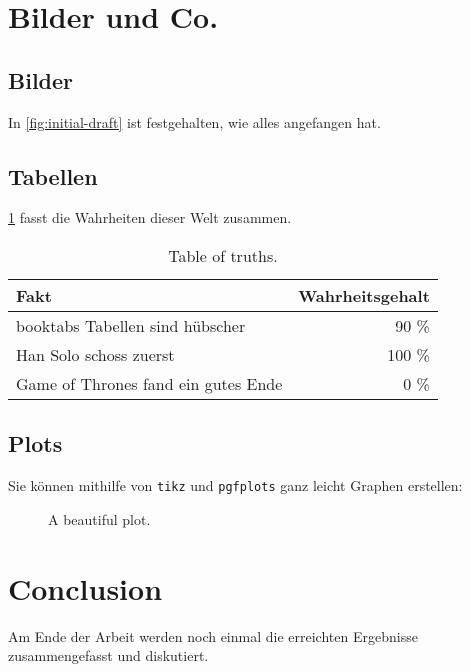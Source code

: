 \section{Bilder und Co.}

\subsection{Bilder}%
\label{sec:figures}

In \cref{fig:initial-draft} ist festgehalten,
wie alles angefangen hat.


\subsection{Tabellen}%
\label{sec:tables}

\cref{table:truths} fasst die Wahrheiten dieser Welt zusammen.

\begin{table}[ht]
  \begin{center}
    \begin{tabular}{lr}
      \toprule
      Fakt                                & Wahrheitsgehalt \\
      \midrule
      booktabs Tabellen sind hübscher     & 90 \%           \\
      Han Solo schoss zuerst              & 100 \%          \\
      Game of Thrones fand ein gutes Ende & 0 \%            \\
      \bottomrule
    \end{tabular}
    \caption{Table of truths.}%
    \label{table:truths}
  \end{center}
\end{table}

\subsection{Plots}%
\label{sec:plot}

Sie können mithilfe von \texttt{tikz} und \texttt{pgfplots}
ganz leicht Graphen erstellen:

\begin{figure}[ht]
  \centering
  \caption{A beautiful plot.}%
  \label{fig:the-plot}
\end{figure}

\section{Conclusion}

Am Ende der Arbeit werden noch einmal die erreichten Ergebnisse
zusammengefasst und diskutiert.
